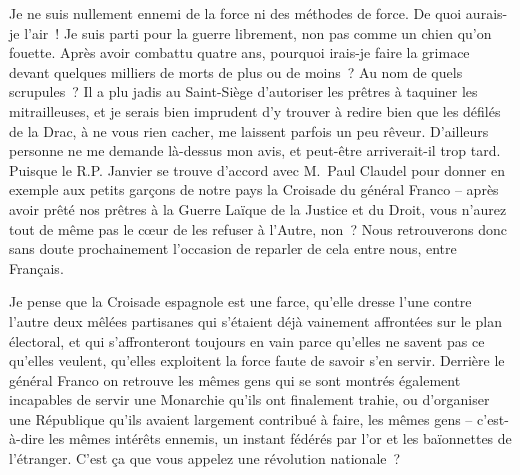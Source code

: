 \documentclass[french,twoside]{book} %
\newcommand{\astertri}{\medskip\par\centerline{\color{rubric}\large\selectfont{\syms ✻\,✻\,✻}}\medskip\par}%
\begin{document}
Je ne suis nullement ennemi de la force ni des méthodes de force. De quoi aurais-je l’air ! Je suis parti pour la guerre librement, non pas comme un chien qu’on fouette. Après avoir combattu quatre ans, pourquoi irais-je faire la grimace devant quelques milliers de morts de plus ou de moins ? Au nom de quels scrupules ? Il a plu jadis au Saint-Siège d’autoriser les prêtres à taquiner les mitrailleuses, et je serais bien imprudent d’y trouver à redire bien que les défilés de la Drac, à ne vous rien cacher, me laissent parfois un peu rêveur. D’ailleurs personne ne me demande là-dessus mon avis, et peut-être arriverait-il trop tard. Puisque le R.P. Janvier se trouve d’accord avec M. Paul Claudel pour donner en exemple aux petits garçons de notre pays la Croisade du général Franco – après avoir prêté nos prêtres à la Guerre Laïque de la Justice et du Droit, vous n’aurez tout de même pas le cœur de les refuser à l’Autre, non ? Nous retrouverons donc sans doute prochainement l’occasion de reparler de cela entre nous, entre Français.\par
Je pense que la Croisade espagnole est une farce, qu’elle dresse l’une contre l’autre deux mêlées partisanes qui s’étaient déjà vainement affrontées sur le plan électoral, et qui s’affronteront toujours en vain parce qu’elles ne savent pas ce qu’elles veulent, qu’elles exploitent la force faute de savoir s’en servir. Derrière le général Franco on retrouve les mêmes gens qui se sont montrés également incapables de servir une Monarchie qu’ils ont finalement trahie, ou d’organiser une République qu’ils avaient largement contribué à faire, les mêmes gens – c’est-à-dire les mêmes intérêts ennemis, un instant fédérés par l’or et les baïonnettes de l’étranger. C’est ça que vous appelez une révolution nationale ?\par
 \par

\astertri
\end{document}
